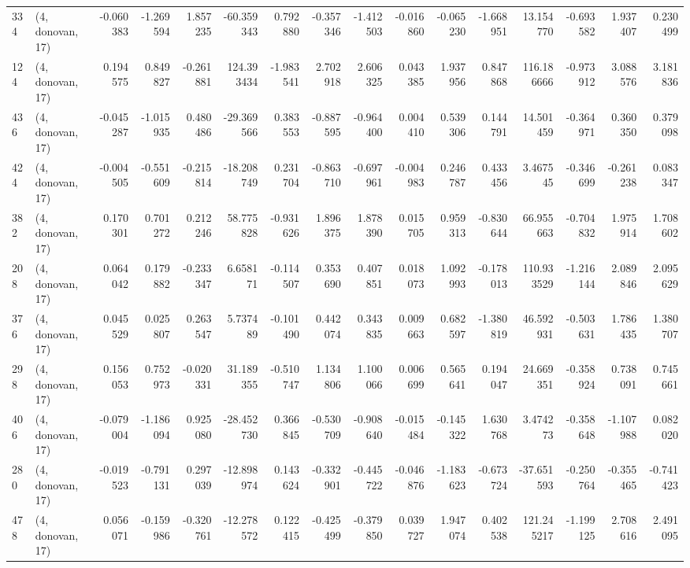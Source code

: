 \begin{tabular}{llrrrrrrrrrrrrrr}
334 &  (4, donovan, 17) &  -0.060383 & -1.269594 &  1.857235 &  -60.359343 &  0.792880 &  -0.357346 & -1.412503 & -0.016860 & -0.065230 & -1.668951 &    13.154770 & -0.693582 &  1.937407 &  0.230499 \\
124 &  (4, donovan, 17) &   0.194575 &  0.849827 & -0.261881 &  124.393434 & -1.983541 &   2.702918 &  2.606325 &  0.043385 &  1.937956 &  0.847868 &   116.186666 & -0.973912 &  3.088576 &  3.181836 \\
436 &  (4, donovan, 17) &  -0.045287 & -1.015935 &  0.480486 &  -29.369566 &  0.383553 &  -0.887595 & -0.964400 &  0.004410 &  0.539306 &  0.144791 &    14.501459 & -0.364971 &  0.360350 &  0.379098 \\
424 &  (4, donovan, 17) &  -0.004505 & -0.551609 & -0.215814 &  -18.208749 &  0.231704 &  -0.863710 & -0.697961 & -0.004983 &  0.246787 &  0.433456 &     3.467545 & -0.346699 & -0.261238 &  0.083347 \\
382 &  (4, donovan, 17) &   0.170301 &  0.701272 &  0.212246 &   58.775828 & -0.931626 &   1.896375 &  1.878390 &  0.015705 &  0.959313 & -0.830644 &    66.955663 & -0.704832 &  1.975914 &  1.708602 \\
208 &  (4, donovan, 17) &   0.064042 &  0.179882 & -0.233347 &    6.658171 & -0.114507 &   0.353690 &  0.407851 &  0.018073 &  1.092993 & -0.178013 &   110.933529 & -1.216144 &  2.089846 &  2.095629 \\
376 &  (4, donovan, 17) &   0.045529 &  0.025807 &  0.263547 &    5.737489 & -0.101490 &   0.442074 &  0.343835 &  0.009663 &  0.682597 & -1.380819 &    46.592931 & -0.503631 &  1.786435 &  1.380707 \\
298 &  (4, donovan, 17) &   0.156053 &  0.752973 & -0.020331 &   31.189355 & -0.510747 &   1.134806 &  1.100066 &  0.006699 &  0.565641 &  0.194047 &    24.669351 & -0.358924 &  0.738091 &  0.745661 \\
406 &  (4, donovan, 17) &  -0.079004 & -1.186094 &  0.925080 &  -28.452730 &  0.366845 &  -0.530709 & -0.908640 & -0.015484 & -0.145322 &  1.630768 &     3.474273 & -0.358648 & -1.107988 &  0.082020 \\
280 &  (4, donovan, 17) &  -0.019523 & -0.791131 &  0.297039 &  -12.898974 &  0.143624 &  -0.332901 & -0.445722 & -0.046876 & -1.183623 & -0.673724 &   -37.651593 & -0.250764 & -0.355465 & -0.741423 \\
478 &  (4, donovan, 17) &   0.056071 & -0.159986 & -0.320761 &  -12.278572 &  0.122415 &  -0.425499 & -0.379850 &  0.039727 &  1.947074 &  0.402538 &   121.245217 & -1.199125 &  2.708616 &  2.491095 \\

\end{tabular}
